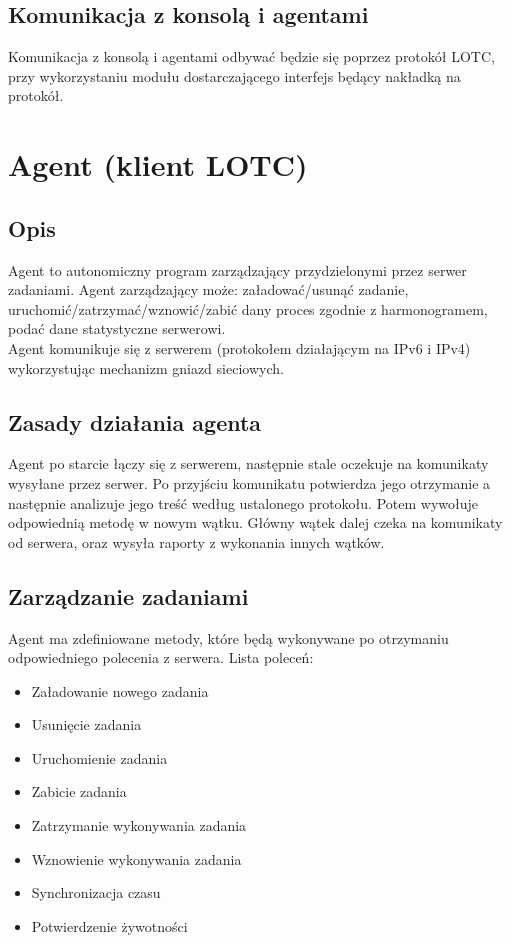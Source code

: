 \documentclass[10pt,a4paper]{article}
\begin{document}
		\subsection{Komunikacja z konsolą i agentami}
			Komunikacja z konsolą i agentami odbywać będzie się poprzez protokół LOTC, przy wykorzystaniu modułu dostarczającego interfejs będący nakładką na protokół. \\
			
    
    \section{Agent (klient LOTC)}
		\subsection{Opis}
			Agent to autonomiczny program zarządzający przydzielonymi przez serwer zadaniami. Agent zarządzający może: załadować/usunąć zadanie, uruchomić/zatrzymać/wznowić/zabić dany proces zgodnie z harmonogramem, podać dane statystyczne serwerowi. \\
			Agent komunikuje się z serwerem (protokołem działającym na IPv6 i IPv4) wykorzystując mechanizm gniazd sieciowych. \\
		
		\subsection{Zasady działania agenta}
			Agent po starcie łączy się z serwerem, następnie stale oczekuje na komunikaty wysyłane przez serwer. Po przyjściu komunikatu potwierdza jego otrzymanie a następnie analizuje jego treść według ustalonego protokołu. Potem wywołuje odpowiednią metodę w nowym wątku. Główny wątek dalej czeka na komunikaty od serwera, oraz wysyła raporty z wykonania innych wątków. \\
		
		\subsection{Zarządzanie zadaniami}
			Agent ma zdefiniowane metody, które będą wykonywane po otrzymaniu odpowiedniego polecenia z serwera. Lista poleceń: \\
			
			\begin{itemize}
				\item Załadowanie nowego zadania
				\item Usunięcie zadania
				\item Uruchomienie zadania
				\item Zabicie zadania
				\item Zatrzymanie wykonywania zadania
				\item Wznowienie wykonywania zadania
				\item Synchronizacja czasu
				\item Potwierdzenie żywotności 
			\end{itemize}
\end{document}
